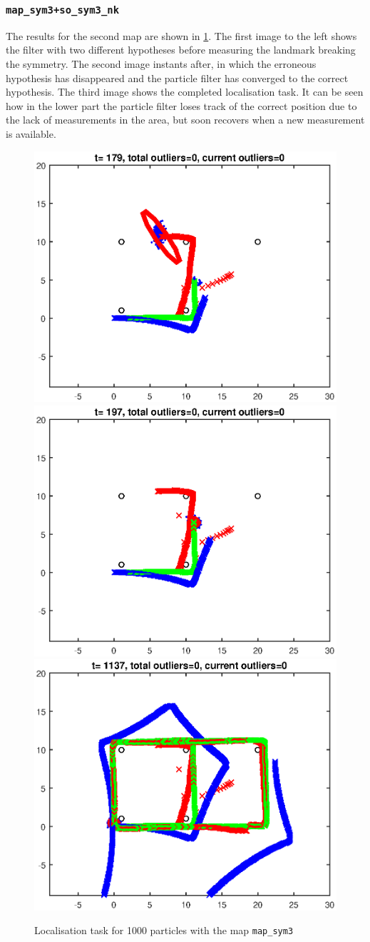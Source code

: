 \documentclass[12pt]{article}
\begin{document}
\subsubsection{\texttt{map\_sym3+so\_sym3\_nk}}

The results for the second map are shown in \ref{fig:loc3}. The first image to the left shows the filter with two different hypotheses before measuring the landmark breaking the symmetry. The second image instants after, in which the erroneous hypothesis has disappeared and the particle filter has converged to the correct hypothesis. The third image shows the completed localisation task. It can be seen how in the lower part the particle filter loses track of the correct position due to the lack of measurements in the area, but soon recovers when a new measurement is available.
\begin{figure}[htp]

\centering
\includegraphics[width=.3\textwidth]{sym3loc1000_t179}\hfill
\includegraphics[width=.3\textwidth]{sym3loc1000_t197}\hfill
\includegraphics[width=.3\textwidth]{sym3loc1000_end}

\caption{Localisation task for 1000 particles with the map \texttt{map\_sym3}}
\label{fig:loc3}

\end{figure}
\end{document}
